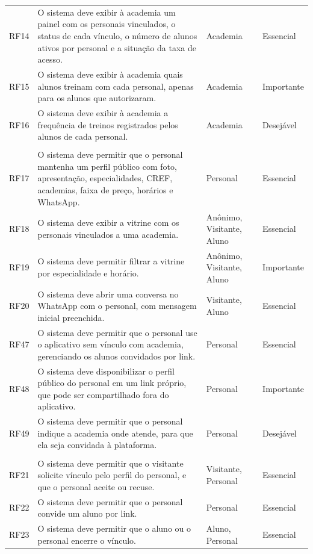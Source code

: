 \begin{longtable}{@{}>{\raggedright\arraybackslash}p{1.2cm} >{\raggedright\arraybackslash}p{7.6cm} >{\raggedright\arraybackslash}p{2.7cm} >{\raggedright\arraybackslash}p{2.4cm}@{}}
  RF14 & O sistema deve exibir à academia um painel com os personais vinculados, o status de cada vínculo, o número de alunos ativos por personal e a situação da taxa de acesso. & Academia & Essencial \\
  RF15 & O sistema deve exibir à academia quais alunos treinam com cada personal, apenas para os alunos que autorizaram. & Academia & Importante \\
  RF16 & O sistema deve exibir à academia a frequência de treinos registrados pelos alunos de cada personal. & Academia & Desejável \\
  \addlinespace
  \multicolumn{4}{@{}l}{\textbf{Perfil e vitrine}} \\
  RF17 & O sistema deve permitir que o personal mantenha um perfil público com foto, apresentação, especialidades, CREF, academias, faixa de preço, horários e WhatsApp. & Personal & Essencial \\
  RF18 & O sistema deve exibir a vitrine com os personais vinculados a uma academia. & Anônimo, Visitante, Aluno & Essencial \\
  RF19 & O sistema deve permitir filtrar a vitrine por especialidade e horário. & Anônimo, Visitante, Aluno & Importante \\
  RF20 & O sistema deve abrir uma conversa no WhatsApp com o personal, com mensagem inicial preenchida. & Visitante, Aluno & Essencial \\
  RF47 & O sistema deve permitir que o personal use o aplicativo sem vínculo com academia, gerenciando os alunos convidados por link. & Personal & Essencial \\
  RF48 & O sistema deve disponibilizar o perfil público do personal em um link próprio, que pode ser compartilhado fora do aplicativo. & Personal & Importante \\
  RF49 & O sistema deve permitir que o personal indique a academia onde atende, para que ela seja convidada à plataforma. & Personal & Desejável \\
  \addlinespace
  \multicolumn{4}{@{}l}{\textbf{Vínculo entre personal e aluno}} \\
  RF21 & O sistema deve permitir que o visitante solicite vínculo pelo perfil do personal, e que o personal aceite ou recuse. & Visitante, Personal & Essencial \\
  RF22 & O sistema deve permitir que o personal convide um aluno por link. & Personal & Essencial \\
  RF23 & O sistema deve permitir que o aluno ou o personal encerre o vínculo. & Aluno, Personal & Essencial \\

\end{longtable}
